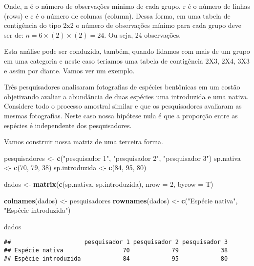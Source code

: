 \documentclass[]{book}
\newenvironment{Shaded}{\begin{snugshade}}{\end{snugshade}}
\newcommand{\DataTypeTok}[1]{\textcolor[rgb]{0.13,0.29,0.53}{#1}}
\newcommand{\DecValTok}[1]{\textcolor[rgb]{0.00,0.00,0.81}{#1}}
\newcommand{\KeywordTok}[1]{\textcolor[rgb]{0.13,0.29,0.53}{\textbf{#1}}}
\newcommand{\NormalTok}[1]{#1}
\newcommand{\StringTok}[1]{\textcolor[rgb]{0.31,0.60,0.02}{#1}}
\begin{document}
Onde, n é o número de observações mínimo de cada grupo, r é o número de linhas (rows) e c é o número de colunas (column). Dessa forma, em uma tabela de contigência do tipo 2x2 o número de observações mínimo para cada grupo deve ser de: \(n = 6 \times (2) \times (2) = 24\). Ou seja, 24 observações.

Esta análise pode ser conduzida, também, quando lidamos com mais de um grupo em uma categoria e neste caso teriamos uma tabela de contigência 2X3, 2X4, 3X3 e assim por diante. Vamos ver um exemplo.

Três pesquisadores analisaram fotografias de espécies bentônicas em um costão objetivando avaliar a abundância de duas espécies uma introduzida e uma nativa. Considere todo o processo amostral similar e que os pesquisadores avaliaram as mesmas fotografias. Neste caso nossa hipótese nula é que a proporção entre as espécies é independente dos pesquisadores.

Vamos construir nossa matriz de uma terceira forma.

\begin{Shaded}
\begin{Highlighting}[]
\NormalTok{pesquisadores <-}\StringTok{ }\KeywordTok{c}\NormalTok{(}\StringTok{"pesquisador 1"}\NormalTok{, }\StringTok{"pesquisador 2"}\NormalTok{, }\StringTok{"pesquisador 3"}\NormalTok{)}
\NormalTok{sp.nativa <-}\StringTok{ }\KeywordTok{c}\NormalTok{(}\DecValTok{70}\NormalTok{, }\DecValTok{79}\NormalTok{, }\DecValTok{38}\NormalTok{)}
\NormalTok{sp.introduzida <-}\StringTok{ }\KeywordTok{c}\NormalTok{(}\DecValTok{84}\NormalTok{, }\DecValTok{95}\NormalTok{, }\DecValTok{80}\NormalTok{)}

\NormalTok{dados <-}\StringTok{ }\KeywordTok{matrix}\NormalTok{(}\KeywordTok{c}\NormalTok{(sp.nativa, sp.introduzida), }\DataTypeTok{nrow =} \DecValTok{2}\NormalTok{, }\DataTypeTok{byrow =}\NormalTok{ T)}

\KeywordTok{colnames}\NormalTok{(dados) <-}\StringTok{ }\NormalTok{pesquisadores}
\KeywordTok{rownames}\NormalTok{(dados) <-}\StringTok{ }\KeywordTok{c}\NormalTok{(}\StringTok{"Espécie nativa"}\NormalTok{, }\StringTok{"Espécie introduzida"}\NormalTok{)}

\NormalTok{dados}
\end{Highlighting}
\end{Shaded}

\begin{verbatim}
##                     pesquisador 1 pesquisador 2 pesquisador 3
## Espécie nativa                 70            79            38
## Espécie introduzida            84            95            80
\end{verbatim}
\end{document}
